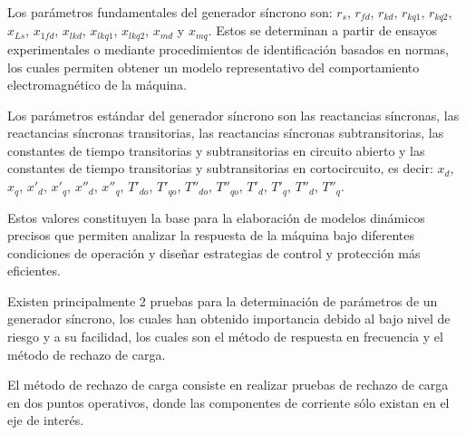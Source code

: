 \documentclass[conference]{IEEEtran}
\begin{document}
Los parámetros fundamentales del generador síncrono son: $r_s$, $r_{fd}$, $r_{kd}$, $r_{kq1}$, $r_{kq2}$, $x_{Ls}$, $x_{1fd}$, $x_{lkd}$, $x_{lkq1}$, $x_{lkq2}$, $x_{md}$ y $x_{mq}$. Estos se determinan a partir de ensayos experimentales o mediante procedimientos de identificación basados en normas, los cuales permiten obtener un modelo representativo del comportamiento electromagnético de la máquina.

Los parámetros estándar del generador síncrono son las reactancias síncronas, las reactancias síncronas transitorias, las reactancias síncronas subtransitorias, las constantes de tiempo transitorias y subtransitorias en circuito abierto y las constantes de tiempo transitorias y subtransitorias en cortocircuito, es decir: $x_d$, $x_q$, $x'_d$, $x'_q$, $x''_d$, $x''_q$, $T'_{do}$, $T'_{qo}$, $T''_{do}$, $T''_{qo}$, $T'_{d}$, $T'_{q}$, $T''_{d}$, $T''_{q}$.

Estos valores constituyen la base para la elaboración de modelos dinámicos precisos que permiten analizar la respuesta de la máquina bajo diferentes condiciones de operación y diseñar estrategias de control y protección más eficientes.

Existen principalmente 2 pruebas para la determinación de parámetros de un generador síncrono, los cuales han obtenido importancia debido al bajo nivel de riesgo y a su facilidad, los cuales son el método de respuesta en frecuencia y el método de rechazo de carga.


El método de rechazo de carga consiste en realizar pruebas de rechazo de carga en dos puntos operativos, donde las componentes de corriente sólo existan en el eje de interés. %
\end{document}
